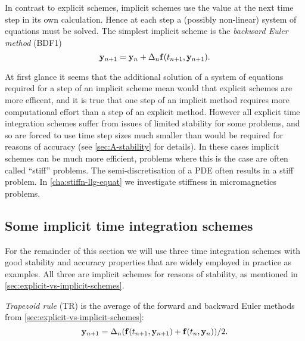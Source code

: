 In contrast to explicit schemes, implicit schemes use the value at the next time step in its own calculation.
Hence at each step a (possibly non-linear) system of equations must be solved.
The simplest implicit scheme is the \emph{backward Euler method} (BDF1)
\begin{equation}
  \label{eq:bdf1-definition}
  \mathbf{y}_{n+1} = \mathbf{y}_n + \Delta_{n} {\mathbf{f}{\left( t_{n+1}, \mathbf{y}_{n+1} \right)}}.
\end{equation}

At first glance it seems that the additional solution of a system of equations required for a step of an implicit scheme mean would that explicit schemes are more efficent, and it is true that one step of an implicit method requires more computational effort than a step of an explicit method.
However all explicit time integration schemes suffer from issues of limited stability for some problems, and so are forced to use time step sizes much smaller than would be required for reasons of accuracy (see \cref{sec:A-stability} for details).
In these cases implicit schemes can be much more efficient, problems where this is the case are often called ``stiff'' problems.
The semi-discretisation of a PDE often results in a stiff problem.
In \cref{cha:stiffn-llg-equat} we investigate stiffness in micromagnetics problems.




\subsection{Some implicit time integration schemes}
\label{sec:some-implicit-time-integrators}

For the remainder of this section we will use three time integration schemes with good stability and accuracy properties that are widely employed in practice as examples.
All three are implicit schemes for reasons of stability, as mentioned in \cref{sec:explicit-vs-implicit-schemes}.

\emph{Trapezoid rule} (TR) is the average of the forward and backward Euler methods from \cref{sec:explicit-vs-implicit-schemes}:
\begin{equation}
  \mathbf{y}_{n+1} = \Delta_{n} ({\mathbf{f}{\left( t_{n+1}, \mathbf{y}_{n+1} \right)}} + {\mathbf{f}{\left( t_n, \mathbf{y}_n \right)}})/2.
  \label{eq:tr-definition}
\end{equation}


